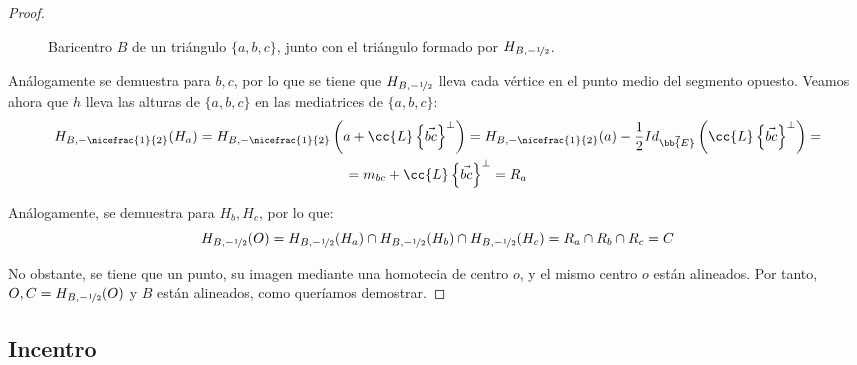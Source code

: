 \begin{proof}
\begin{figure}[H]
        \caption{\centering Baricentro $B$ de un triángulo $\{a,b,c\}$, junto con el triángulo formado por $H_{B,-\nicefrac{1}{2}}$.}
    \end{figure}
    Análogamente se demuestra para $b,c$, por lo que se tiene que $H_{B,-\nicefrac{1}{2}}$ lleva cada vértice en el punto medio del segmento opuesto. Veamos ahora que $h$ lleva las alturas de $\{a,b,c\}$ en las mediatrices de $\{a,b,c\}$:
    \begin{multline*}
        H_{B,-\nicefrac{1}{2}}(H_a) = H_{B,-\nicefrac{1}{2}}\left(a + \cc{L}\left\{\vec{bc}\right\}^\perp\right)
        = H_{B,-\nicefrac{1}{2}}(a) -\frac{1}{2}Id_{\vec{\bb{E}}}\left(\cc{L}\left\{\vec{bc}\right\}^\perp\right) =\\= m_{bc} + \cc{L}\left\{\vec{bc}\right\}^\perp= R_a
    \end{multline*}
    
    Análogamente, se demuestra para $H_b, H_c$, por lo que:
    \begin{equation*}
        H_{B,-\nicefrac{1}{2}}(O) = H_{B,-\nicefrac{1}{2}}(H_a) \cap H_{B,-\nicefrac{1}{2}}(H_b) \cap H_{B,-\nicefrac{1}{2}}(H_c) = R_a\cap R_b \cap R_c = C
    \end{equation*}
    
    No obstante, se tiene que un punto, su imagen mediante una homotecia de centro $o$, y el mismo centro $o$ están alineados. Por tanto, $O, C=H_{B,-\nicefrac{1}{2}}(O)$ y $B$ están alineados, como queríamos demostrar.
\end{proof}

\subsection{Incentro}

